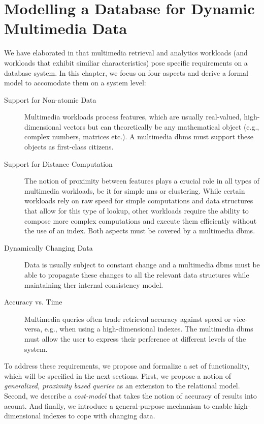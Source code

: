 \chapter{Modelling a Database for Dynamic Multimedia Data}
\label{chapter:system_model}

We have elaborated in  that multimedia retrieval and analytics workloads (and workloads that exhibit similiar characteristics) pose specific requirements on a database system. In this chapter, we focus on four aspects and derive a formal model to accomodate them on a system level:

\begin{description}
    \item[Support for Non-atomic Data] Multimedia workloads process features, which are usually real-valued, high-dimensional vectors but can theoretically be any mathematical object (e.g., complex numbers, matrices etc.). A multimedia \acrshort{dbms} must support these objects as first-class citizens.
    \item[Support for Distance Computation] The notion of proximity between features plays a crucial role in all types of multimedia workloads, be it for simple \acrshort{nns} or clustering. While certain workloads rely on raw speed for simple computations and data structures that allow for this type of lookup, other workloads require the ability to compose more complex computations and execute them efficiently without the use of an index. Both aspects must be covered by a multimedia \acrshort{dbms}.
    \item[Dynamically Changing Data] Data is usually subject to constant change and a multimedia \acrshort{dbms} must be able to propagate these changes to all the relevant data structures while maintaining ther internal consistency model.
    \item[Accuracy vs. Time] Multimedia queries often trade retrieval accuracy against speed or vice-versa, e.g., when using a high-dimensional indexes. The multimedia \acrshort{dbms} must allow the user to express their perference at different levels of the system.
\end{description}

To address these requirements, we propose and formalize a set of functionality, which will be specified in the next sections. First, we propose a notion of \emph{generalized, proximity based queries} as an extension to the relational model. Second, we describe a \emph{cost-model} that takes the notion of accuracy of results into acount. And finally, we introduce a general-purpose mechanism to enable high-dimensional indexes to cope with changing data.

